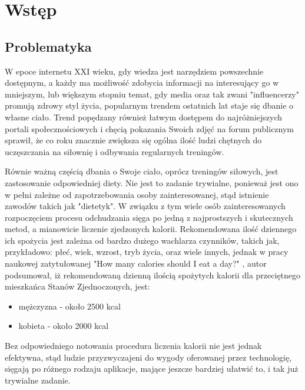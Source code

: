 \documentclass[12pt, a4paper]{article}
\begin{document}
\begin{sloppypar}


\tableofcontents
\newpage

\section{Wstęp}
{
  \subsection{Problematyka}
  {
    W epoce internetu XXI wieku, gdy wiedza jest narzędziem powszechnie dostępnym, a 
    każdy ma możliwość zdobycia informacji na interesujący go w mniejszym,
    lub większym stopniu temat, gdy media oraz tak zwani "influencerzy" promują zdrowy
    styl życia, popularnym trendem ostatnich lat staje się dbanie o własne ciało. 
    Trend popędzany również łatwym dostępem do najróżniejszych portali
    społecznościowych i chęcią pokazania Swoich zdjęć na forum publicznym sprawił, 
    że co roku znacznie zwiększa się ogólna ilość ludzi chętnych do uczęszczania na
    siłownię i odbywania regularnych treningów.

    Równie ważną częścią dbania o Swoje ciało, oprócz treningów siłowych, jest 
    zastosowanie odpowiedniej diety. Nie jest to zadanie trywialne, ponieważ jest 
    ono w pełni zależne od zapotrzebowania osoby zainteresowanej, stąd istnienie
    zawodów takich jak "dietetyk". W związku z tym wiele osób zainteresowanych
    rozpoczęciem procesu odchudzania sięga po jedną z najprostszych i skutecznych
    metod, a mianowicie liczenie zjedzonych kalorii. Rekomendowana ilość
    dziennego ich spożycia jest zależna od bardzo dużego wachlarza czynników, 
    takich jak, przykładowo: płeć, wiek, wzrost, tryb życia, oraz wiele innych, 
    jednak w pracy naukowej zatytułowanej "How many calories should I eat a day?"
    \cite{cal}, autor podsumował, iż rekomendowaną dzienną ilością spożytych kalorii 
    dla przeciętnego mieszkańca Stanów Zjednoczonych, jest:
    \begin{itemize}
      \item mężczyzna - około 2500 kcal
      \item kobieta - około 2000 kcal
    \end{itemize}
    Bez odpowiedniego notowania procedura liczenia kalorii nie jest jednak efektywna, 
    stąd ludzie przyzwyczajeni do wygody oferowanej przez technologię, sięgają po 
    różnego rodzaju aplikacje, mające jeszcze bardziej ułatwić to, i tak już trywialne
    zadanie.

}}
\end{sloppypar}
\end{document}
